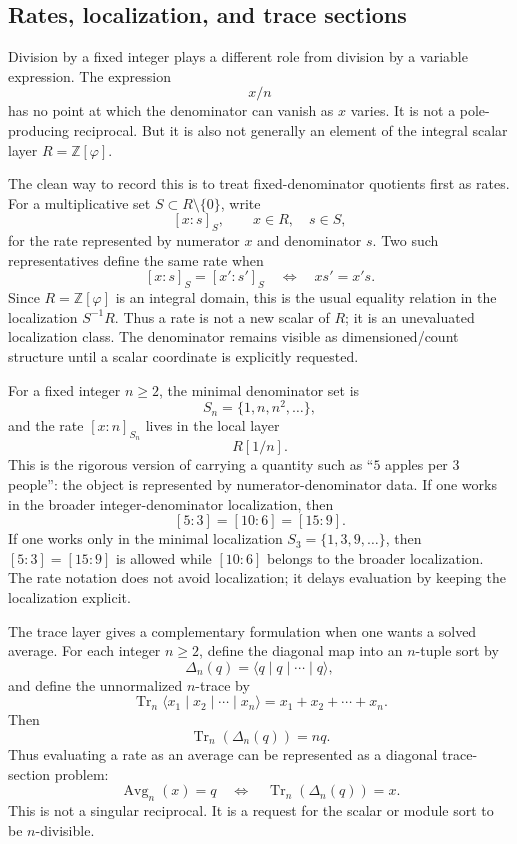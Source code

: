 \documentclass[11pt]{article}
\newcommand{\Tr}{\operatorname{Tr}}
\newcommand{\ph}{\varphi}
\newcommand{\Z}{\mathbb{Z}}
\begin{document}
\subsection{Rates, localization, and trace sections}\label{subsec:averaging}

Division by a fixed integer plays a different role from division by a variable expression.  The expression
\[
    x/n
\]
has no point at which the denominator can vanish as $x$ varies.  It is not a pole-producing reciprocal.  But it is also not generally an element of the integral scalar layer $R=\Z[\ph]$.

The clean way to record this is to treat fixed-denominator quotients first as rates.  For a multiplicative set $S\subset R\setminus\{0\}$, write
\[
    [x:s]_S,
    \qquad x\in R,
    \quad s\in S,
\]
for the rate represented by numerator $x$ and denominator $s$.  Two such representatives define the same rate when
\[
    [x:s]_S=[x':s']_S
    \quad\Longleftrightarrow\quad
    xs'=x's.
\]
Since $R=\Z[\ph]$ is an integral domain, this is the usual equality relation in the localization $S^{-1}R$.  Thus a rate is not a new scalar of $R$; it is an unevaluated localization class.  The denominator remains visible as dimensioned/count structure until a scalar coordinate is explicitly requested.

For a fixed integer $n\ge2$, the minimal denominator set is
\[
    S_n=\{1,n,n^2,\dots\},
\]
and the rate $[x:n]_{S_n}$ lives in the local layer
\[
    R[1/n].
\]
This is the rigorous version of carrying a quantity such as ``$5$ apples per $3$ people'': the object is represented by numerator-denominator data.  If one works in the broader integer-denominator localization, then
\[
    [5:3]=[10:6]=[15:9].
\]
If one works only in the minimal localization $S_3=\{1,3,9,\dots\}$, then $[5:3]=[15:9]$ is allowed while $[10:6]$ belongs to the broader localization.  The rate notation does not avoid localization; it delays evaluation by keeping the localization explicit.

The trace layer gives a complementary formulation when one wants a solved average.  For each integer $n\ge2$, define the diagonal map into an $n$-tuple sort by
\[
    \Delta_n(q)=\langle q\mid q\mid \cdots \mid q\rangle,
\]
and define the unnormalized $n$-trace by
\[
    \Tr_n\langle x_1\mid x_2\mid\cdots\mid x_n\rangle
    =x_1+x_2+\cdots+x_n.
\]
Then
\[
    \Tr_n(\Delta_n(q))=nq.
\]
Thus evaluating a rate as an average can be represented as a diagonal trace-section problem:
\[
    \operatorname{Avg}_n(x)=q
    \quad\Longleftrightarrow\quad
    \Tr_n(\Delta_n(q))=x.
\]
This is not a singular reciprocal.  It is a request for the scalar or module sort to be $n$-divisible.
\end{document}
